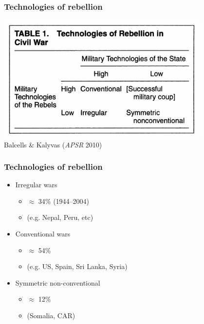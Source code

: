 \documentclass[aspectratio=43]{beamer}
\begin{document}
\begin{frame}
\frametitle{Technologies of rebellion}
\centering

\includegraphics[width = 0.8\textwidth]{img/kalyvas_balcells_tr}\\
{\small Balcells \& Kalyvas (\textit{APSR} 2010)}

\end{frame}

\begin{frame}
\frametitle{Technologies of rebellion}
\centering

\begin{itemize}
  \item Irregular wars
  \begin{itemize}
    \item[] $\approx$ 34\% (1944--2004)
    \item[] (e.g. Nepal, Peru, etc)
  \end{itemize}
  \item Conventional wars
  \begin{itemize}
    \item[] $\approx$ 54\%
    \item[] (e.g. US, Spain, Sri Lanka, Syria)
  \end{itemize}
  \item Symmetric non-conventional
  \begin{itemize}
    \item[] $\approx$ 12\%
    \item[] (Somalia, CAR)
  \end{itemize}
\end{itemize}

\end{frame}
\end{document}
